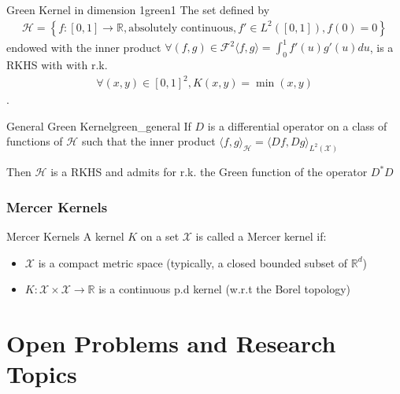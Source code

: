 \documentclass[10pt]{article}
\begin{document}
\begin{Theorem}{Green Kernel in dimension 1}{green1}
  The set defined by
  \begin{align*}
    \mathcal{H} = \left\{f: [0, 1] \rightarrow \mathbb{R}, \text{absolutely 
    continuous}, f' \in L^2([0, 1]), f(0) = 0 \right\}
  \end{align*}
  endowed with the inner product $\forall (f, g) \in \mathcal{F}^2 \langle f, g
  \rangle = \int_0^1 f'(u)g'(u)du$, 
  is a RKHS with with r.k.
  \begin{align*}
    \forall (x, y) \in [0, 1]^2, K(x, y) = \min(x, y)
  \end{align*}.
\end{Theorem}

\begin{Theorem}{General Green Kernel}{green_general}
  If $D$ is a differential operator on a class of functions of $\mathcal{H}$
  such that the inner product $\langle f, g \rangle_\mathcal{H} = \langle Df, Dg 
  \rangle_{L^2(\mathcal{X})}$

  Then $\mathcal{H}$ is a RKHS and admits for r.k. the Green function of the 
  operator $D^*D$
\end{Theorem}


\subsubsection{Mercer Kernels}

\begin{Definition}{Mercer Kernels}{}
  A kernel $K$ on a set $\mathcal{X}$ is called a Mercer kernel if: 
  \begin{itemize}
    \item $\mathcal{X}$ is a compact metric space (typically, a closed bounded
    subset of $\mathbb{R}^d$)
    \item $K: \mathcal{X}\times\mathcal{X} \rightarrow \mathbb{R}$ is a
    continuous p.d kernel (w.r.t the Borel topology)
  \end{itemize}
\end{Definition}

\section{Open Problems and Research Topics}



\appendix
\end{document}
